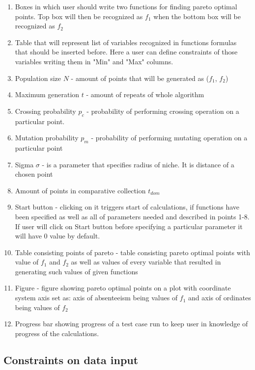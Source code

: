 \documentclass[a4paper, 11pt]{article}
\begin{document}
	\begin{enumerate}
		\item Boxes in which user should write two functions for finding pareto
			optimal points. Top box will then be recognized as $f_{1}$ when the 
			bottom box will be recognized as $f_{2}$
		\item Table that will represent list of variables recognized in functions
			formulas that should be inserted before. Here a user can define 
			constraints of those variables writing them in "Min" and "Max" columns.
		\item Population size $N$ - amount of points that will be generated as
			($f_{1}$, $f_{2}$)
		\item Maximum generation $t$ - amount of repeats of whole algorithm
		\item Crossing probability $p_{c}$ - probability of performing crossing
			operation on a particular point.
		\item Mutation probability $p_{m}$ - probability of performing mutating
			operation on a particular point
		\item Sigma $\sigma$ - is a parameter that specifies radius of niche. It is
			distance of a chosen point 
		\item Amount of points in comparative collection $t_{dom}$
		\item Start button - clicking on it triggers start of calculations, if
			functions have been specified as well as all of parameters needed and
			described in points 1-8. If user will click on Start button before
			specifying a particular parameter it will have $0$ value by default.
		\item Table consisting points of pareto - table consisting pareto optimal
			points with value of $f_{1}$ and $f_{2}$ as well as values of every
			variable that resulted in generating such values of given functions
		\item Figure - figure showing pareto optimal points on a plot with
			coordinate system axis set as: axis of absenteeism being values of
			$f_{1}$ and axis of ordinates being values of $f_{2}$
		\item Progress bar showing progress of a test case run to keep user in
			knowledge of progress of the calculations.
	\end{enumerate}

	\subsection{Constraints on data input}
\end{document}
